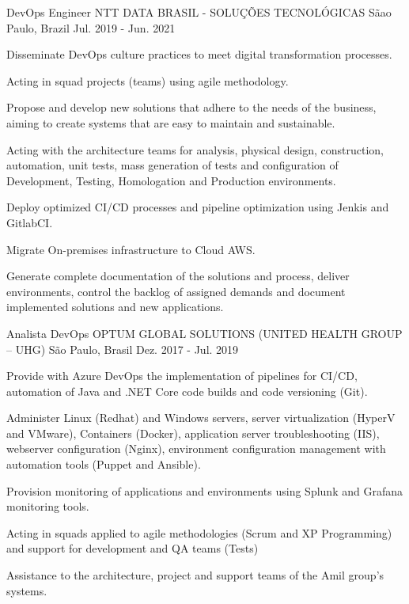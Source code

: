 \begin{cventries}
  \cventry
    {DevOps Engineer} %
    {NTT DATA BRASIL - SOLUÇÕES TECNOLÓGICAS} %
    {Sãao Paulo, Brazil} %
    {Jul. 2019 - Jun. 2021} %
    {
      \begin{cvitems} %
        \item {Disseminate DevOps culture practices to meet digital transformation processes.}
        \item {Acting in squad projects (teams) using agile methodology.}
        \item {Propose and develop new solutions that adhere to the needs of the business, aiming to create systems that are easy to maintain and sustainable.}
        \item {Acting with the architecture teams for analysis, physical design, construction, automation, unit tests, mass generation of tests and configuration of Development, Testing, Homologation and Production environments.}
        \item {Deploy optimized CI/CD processes and pipeline optimization using Jenkis and GitlabCI.}
        \item {Migrate On-premises infrastructure to Cloud AWS.}
        \item {Generate complete documentation of the solutions and process, deliver environments, control the backlog of assigned demands and document implemented solutions and new applications.}
      \end{cvitems}
    }

  \cventry
    {Analista DevOps} %
    {OPTUM GLOBAL SOLUTIONS (UNITED HEALTH GROUP – UHG)} %
    {São Paulo, Brasil} %
    {Dez. 2017 - Jul. 2019} %
    {
      \begin{cvitems} %
        \item {Provide with Azure DevOps the implementation of pipelines for CI/CD, automation of Java and .NET Core code builds and code versioning (Git).}
        \item {Administer Linux (Redhat) and Windows servers, server virtualization (HyperV and VMware), Containers (Docker), application server troubleshooting (IIS), webserver configuration (Nginx), environment configuration management with automation tools (Puppet and Ansible).}
        \item {Provision monitoring of applications and environments using Splunk and Grafana monitoring tools.}
        \item {Acting in squads applied to agile methodologies (Scrum and XP Programming) and support for development and QA teams (Tests)}
        \item {Assistance to the architecture, project and support teams of the Amil group's systems.}
      \end{cvitems}
    }


\end{cventries}